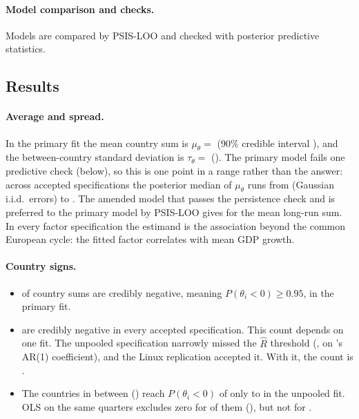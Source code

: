 \paragraph{Model comparison and checks.} Models are compared by PSIS-LOO
\citep{vehtari2017loo} and checked with posterior predictive statistics.

\subsection{Results}

\paragraph{Average and spread.} In the primary fit the mean country sum is
$\mu_\theta=$  (90\% credible interval ), and the
between-country standard deviation is $\tau_\theta=$  ().
The primary model fails one predictive check (below), so this is one point in a range
rather than the answer: across accepted specifications the posterior median of
$\mu_\theta$ runs from  (Gaussian i.i.d.\ errors) to . The
amended model that passes the persistence check and is preferred to the primary model by
PSIS-LOO gives
  for the mean long-run sum. In every factor specification the
estimand is the association beyond the common European cycle: the fitted factor
correlates  with mean GDP growth.

\paragraph{Country signs.}
\begin{itemize}
  \item {} of  country sums are credibly negative,
    meaning $P(\theta_i<0)\ge 0.95$, in the primary fit.
  \item {} are credibly negative in every accepted specification. This
    count depends on one fit. The unpooled specification narrowly missed the
    $\widehat R$ threshold (, on 's AR(1)
    coefficient), and the Linux replication accepted it. With it, the count is
    .
  \item The  countries in between ()
    reach $P(\theta_i<0)$ of only  to  in the
    unpooled fit. OLS on the same quarters excludes zero for  of
    them (), but not for .
\end{itemize}

